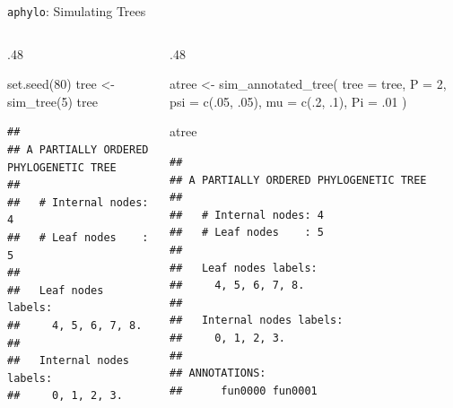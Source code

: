\documentclass[9pt,ignorenonframetext,aspectratio=169]{beamer}
\newenvironment{Shaded}{\begin{snugshade}}{\end{snugshade}}
\newcommand{\KeywordTok}[1]{\textcolor[rgb]{0.94,0.87,0.69}{#1}}
\newcommand{\DataTypeTok}[1]{\textcolor[rgb]{0.87,0.87,0.75}{#1}}
\newcommand{\DecValTok}[1]{\textcolor[rgb]{0.86,0.86,0.80}{#1}}
\newcommand{\StringTok}[1]{\textcolor[rgb]{0.80,0.58,0.58}{#1}}
\newcommand{\NormalTok}[1]{\textcolor[rgb]{0.80,0.80,0.80}{#1}}
\def\begincols{\begin{columns}[T]}
\def\begincol{\begin{column}[T]}
\def\endcol{\end{column}}
\def\endcols{\end{columns}}
\begin{document}
\begin{frame}[fragile,t]{\texttt{aphylo}: Simulating Trees}

\begincols

\begincol{.48\textwidth}

\footnotesize

\begin{Shaded}
\begin{Highlighting}[]
\KeywordTok{set.seed}\NormalTok{(}\DecValTok{80}\NormalTok{)}
\NormalTok{tree <-}\StringTok{ }\KeywordTok{sim_tree}\NormalTok{(}\DecValTok{5}\NormalTok{)}
\NormalTok{tree}
\end{Highlighting}
\end{Shaded}

\begin{verbatim}
## 
## A PARTIALLY ORDERED PHYLOGENETIC TREE
## 
##   # Internal nodes: 4
##   # Leaf nodes    : 5
## 
##   Leaf nodes labels: 
##     4, 5, 6, 7, 8.
## 
##   Internal nodes labels:
##     0, 1, 2, 3.
\end{verbatim}

\normalsize

\endcol

\begincol{.48\textwidth}

\footnotesize

\begin{Shaded}
\begin{Highlighting}[]
\NormalTok{atree <-}\StringTok{ }\KeywordTok{sim_annotated_tree}\NormalTok{(}
  \DataTypeTok{tree =}\NormalTok{ tree, }\DataTypeTok{P =} \DecValTok{2}\NormalTok{,}
  \DataTypeTok{psi  =} \KeywordTok{c}\NormalTok{(.}\DecValTok{05}\NormalTok{, .}\DecValTok{05}\NormalTok{),}
  \DataTypeTok{mu   =} \KeywordTok{c}\NormalTok{(.}\DecValTok{2}\NormalTok{, .}\DecValTok{1}\NormalTok{),}
  \DataTypeTok{Pi   =}\NormalTok{ .}\DecValTok{01}
\NormalTok{  )}

\NormalTok{atree}
\end{Highlighting}
\end{Shaded}

\begin{verbatim}
## 
## A PARTIALLY ORDERED PHYLOGENETIC TREE
## 
##   # Internal nodes: 4
##   # Leaf nodes    : 5
## 
##   Leaf nodes labels: 
##     4, 5, 6, 7, 8.
## 
##   Internal nodes labels:
##     0, 1, 2, 3.
## 
## ANNOTATIONS:
##      fun0000 fun0001
\end{verbatim}

\normalsize

\endcol

\endcols

\end{frame}
\end{document}
